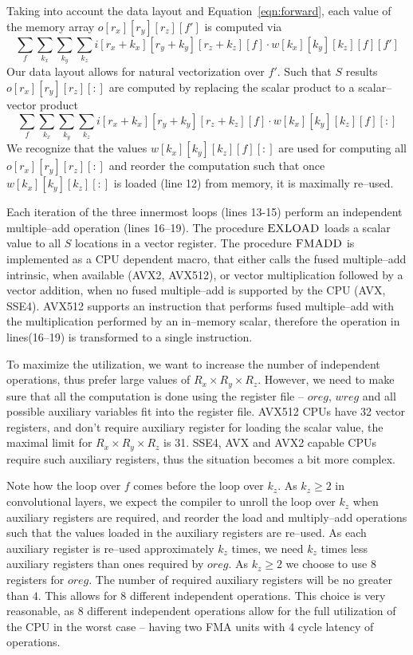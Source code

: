   Taking into account the data layout and Equation~\ref{eqn:forward},
  each value of the memory array $o[r_x][r_y][r_z][f']$ is computed
  via
  {\footnotesize
  \[
  \sum_{f} \sum_{k_x} \sum_{k_y} \sum_{k_z}
  i[r_x+k_x][r_y+k_y][r_z+k_z][f] \cdot w[k_x][k_y][k_z][f][f']
  \]
  } Our data layout allows for natural vectorization over $f'$.  Such
  that $S$ results $o[r_x][r_y][r_z][:]$ are computed by replacing the
  scalar product to a scalar--vector product
  {\footnotesize
  \[
  \sum_{f} \sum_{k_x} \sum_{k_y} \sum_{k_z}
  i[r_x+k_x][r_y+k_y][r_z+k_z][f] \cdot w[k_x][k_y][k_z][f][:]
  \]
  } We recognize that the values $w[k_x][k_y][k_z][f][:]$ are used for
  computing all $o[r_x][r_y][r_z][:]$ and reorder the computation such
  that once $w[k_x][k_y][k_z][:]$ is loaded (line 12) from memory, it
  is maximally re--used.

  Each iteration of the three innermost loops (lines 13-15) perform an
  independent multiple--add operation (lines 16--19).  The procedure
  $\textnormal{\scshape EXLOAD}$ loads a scalar value to all $S$ locations in a
  vector register.  The procedure $\textnormal{\scshape FMADD}$ is implemented as a
  CPU dependent macro, that either calls the fused multiple--add
  intrinsic, when available (AVX2, AVX512), or vector multiplication
  followed by a vector addition, when no fused multiple--add is
  supported by the CPU (AVX, SSE4).  AVX512 supports an instruction
  that performs fused multiple--add with the multiplication performed
  by an in--memory scalar, therefore the operation in lines(16--19) is
  transformed to a single instruction.

  To maximize the utilization, we want to increase the number of
  independent operations, thus prefer large values of $R_x \times R_y
  \times R_z$.  However, we need to make sure that all the computation
  is done using the register file -- $oreg$, $wreg$ and all possible
  auxiliary variables fit into the register file.  AVX512 CPUs have 32
  vector registers, and don't require auxiliary register for loading
  the scalar value, the maximal limit for $R_x \times R_y \times R_z$
  is 31.  SSE4, AVX and AVX2 capable CPUs require such auxiliary
  registers, thus the situation becomes a bit more complex.

  Note how the loop over $f$ comes before the loop over $k_z$.  As
  $k_z \ge 2$ in convolutional layers, we expect the compiler to
  unroll the loop over $k_z$ when auxiliary registers are required,
  and reorder the load and multiply--add operations such that the
  values loaded in the auxiliary registers are re--used.  As each
  auxiliary register is re--used approximately $k_z$ times, we need
  $k_z$ times less auxiliary registers than ones required by $oreg$.
  As $k_z \ge 2$ we choose to use $8$ registers for $oreg$.  The
  number of required auxiliary registers will be no greater than $4$.
  This allows for $8$ different independent operations.  This choice
  is very reasonable, as $8$ different independent operations allow
  for the full utilization of the CPU in the worst case -- having two
  FMA units with 4 cycle latency of operations.

